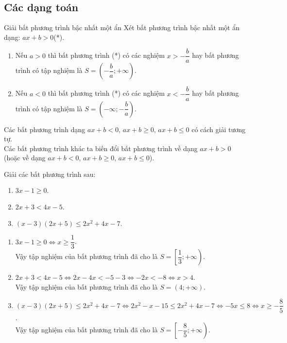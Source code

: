 \subsection{Các dạng toán}
\begin{dang}{Giải bất phương trình bậc nhất một ẩn}
	Xét bất phương trình bậc nhất một ẩn dạng: $ax + b > 0$\hfill (*).
	\begin{enumerate}[$\bullet$]
		\item Nếu $a > 0$ thì bất phương trình (*) có các nghiệm $x > -\dfrac{b}{a}$ hay bất phương trình có tập nghiệm là $S = \left( -\dfrac{b}{a}; +\infty \right)$.
		\item Nếu $a < 0$ thì bất phương trình (*) có các nghiệm $x < -\dfrac{b}{a}$ hay bất phương trình có tập nghiệm là $S = \left( -\infty; -\dfrac{b}{a} \right)$.
	\end{enumerate}
	Các bất phương trình dạng $ax + b < 0$, $ax + b \ge 0$, $ax + b \le 0$ có cách giải tương tự.\\
	Các bất phương trình khác ta biến đổi bất phương trình về dạng $ax + b > 0$ (hoặc về dạng $ax + b < 0$, $ax + b \ge 0$, $ax + b \le 0$).
\end{dang}


\begin{vd}%
	Giải các bất phương trình sau:
	\begin{enumerate}
		\item $3x-1 \geq 0$.
		\item $2x + 3 < 4x - 5$.
		\item $(x-3)(2x+5) \leq 2x^2 + 4x - 7$.
	\end{enumerate}
	
	\loigiai
	{
		\begin{enumerate}
			\item $3x-1 \geq 0 \Leftrightarrow x \geq \dfrac{1}{3}$.\\
			Vậy tập nghiệm của bất phương trình đã cho là $S = \left[\dfrac{1}{3}; +\infty \right)$.
			\item $2x + 3 < 4x - 5 \Leftrightarrow 2x-4x < -5-3 \Leftrightarrow -2x < -8 \Leftrightarrow x > 4$.\\
			Vậy tập nghiệm của bất phương trình đã cho là $S = \left(4; +\infty \right)$.
			\item $(x-3)(2x+5) \leq 2x^2 + 4x - 7 \Leftrightarrow 2x^2 - x - 15 \leq 2x^2 + 4x - 7 \Leftrightarrow -5x \leq 8 \Leftrightarrow x \geq -\dfrac{8}{5}$.\\
			Vậy tập nghiệm của bất phương trình đã cho là $S = \left[-\dfrac{8}{5}; +\infty \right)$.
		\end{enumerate}
		
	}
\end{vd}


